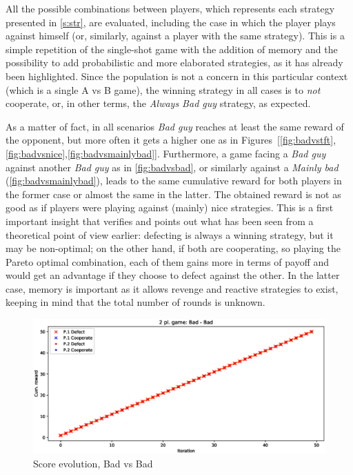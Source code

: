 \documentclass[journal,10pt,twoside]{IEEEtran}
\begin{document}
All the possible combinations between players, which represents each strategy presented in \autoref{s:str}, are evaluated, including the case in which the player plays against himself (or, similarly, against a player with the same strategy).
This is a simple repetition of the single-shot game with the addition of memory and the possibility to add probabilistic and more elaborated strategies, as it has already been highlighted. Since the population is not a concern in this particular context (which is a single A vs B game), the winning strategy in all cases is to \textit{not} cooperate, or, in other terms, the \textit{Always Bad guy} strategy, as expected.

As a matter of fact, in all scenarios \textit{Bad guy} reaches at least the same reward of the opponent, but more often it gets a higher one as in Figures~[\ref{fig:badvstft},\ref{fig:badvsnice},\ref{fig:badvsmainlybad}]. 
Furthermore, a game facing a \textit{Bad guy} against another \textit{Bad guy} as in \autoref{fig:badvsbad}, or similarly against a \textit{Mainly bad} (\autoref{fig:badvsmainlybad}), leads to the same cumulative reward for both players in the former case or almost the same in the latter. The obtained reward is not as good as if players were playing against (mainly) nice strategies.
This is a first important insight that verifies and points out what has been seen from a theoretical point of view earlier: defecting is always a winning strategy, but it may be non-optimal; on the other hand, if both are cooperating, so playing the Pareto optimal combination, each of them gains more in terms of payoff and would get an advantage if they choose to defect against the other. In the latter case, memory is important as it allows revenge and reactive strategies to exist, keeping in mind that the total number of rounds is unknown. 

\begin{figure}[!ht]
    \centering
    \includegraphics[width=.9\columnwidth]{../img/ipd2p/ipd2p-rewards-Bad-Bad}
    \caption{Score evolution, Bad vs Bad}
    \label{fig:badvsbad}
\end{figure}
\end{document}
